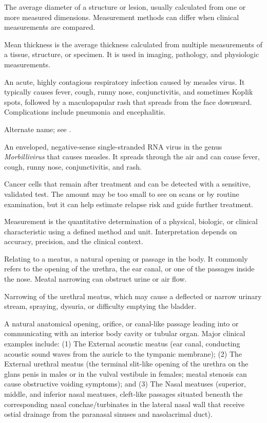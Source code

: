  The average diameter of a structure or lesion, usually calculated from one or more measured dimensions. Measurement methods can differ when clinical measurements are compared.

 Mean thickness is the average thickness calculated from multiple measurements of a tissue, structure, or specimen. It is used in imaging, pathology, and physiologic measurements.

 An acute, highly contagious respiratory infection caused by measles virus. It typically causes fever, cough, runny nose, conjunctivitis, and sometimes Koplik spots, followed by a maculopapular rash that spreads from the face downward. Complications include pneumonia and encephalitis.

 Alternate name; see .

 An enveloped, negative-sense single-stranded RNA virus in the genus \textit{Morbillivirus} that causes measles. It spreads through the air and can cause fever, cough, runny nose, conjunctivitis, and rash.

 Cancer cells that remain after treatment and can be detected with a sensitive, validated test. The amount may be too small to see on scans or by routine examination, but it can help estimate relapse risk and guide further treatment.

 Measurement is the quantitative determination of a physical, biologic, or clinical characteristic using a defined method and unit. Interpretation depends on accuracy, precision, and the clinical context.

 Relating to a meatus, a natural opening or passage in the body. It commonly refers to the opening of the urethra, the ear canal, or one of the passages inside the nose. Meatal narrowing can obstruct urine or air flow.

 Narrowing of the urethral meatus, which may cause a deflected or narrow urinary stream, spraying, dysuria, or difficulty emptying the bladder.

 A natural anatomical opening, orifice, or canal-like passage leading into or communicating with an interior body cavity or tubular organ. Major clinical examples include: (1) The External acoustic meatus (ear canal, conducting acoustic sound waves from the auricle to the tympanic membrane); (2) The External urethral meatus (the terminal slit-like opening of the urethra on the glans penis in males or in the vulval vestibule in females; meatal stenosis can cause obstructive voiding symptoms); and (3) The Nasal meatuses (superior, middle, and inferior nasal meatuses, cleft-like passages situated beneath the corresponding nasal conchae/turbinates in the lateral nasal wall that receive ostial drainage from the paranasal sinuses and nasolacrimal duct).

